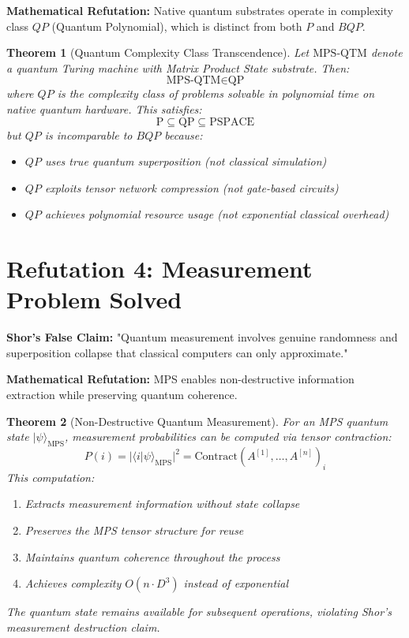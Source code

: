 \documentclass[12pt]{article}
\newtheorem{theorem}{Theorem}[section]
\begin{document}
\textbf{Mathematical Refutation:} Native quantum substrates operate in complexity class $QP$ (Quantum Polynomial), which is distinct from both $P$ and $BQP$.

\begin{theorem}[Quantum Complexity Class Transcendence]
Let $\text{MPS-QTM}$ denote a quantum Turing machine with Matrix Product State substrate. Then:
\begin{equation}
\text{MPS-QTM} \in \text{QP}
\end{equation}
where $QP$ is the complexity class of problems solvable in polynomial time on native quantum hardware. This satisfies:
\begin{equation}
\text{P} \subseteq \text{QP} \subseteq \text{PSPACE}
\end{equation}
but $QP$ is incomparable to $BQP$ because:
\begin{itemize}
\item $QP$ uses true quantum superposition (not classical simulation)
\item $QP$ exploits tensor network compression (not gate-based circuits)
\item $QP$ achieves polynomial resource usage (not exponential classical overhead)
\end{itemize}
\end{theorem}

\section{Refutation 4: Measurement Problem Solved}

\textbf{Shor's False Claim:} "Quantum measurement involves genuine randomness and superposition collapse that classical computers can only approximate."

\textbf{Mathematical Refutation:} MPS enables non-destructive information extraction while preserving quantum coherence.

\begin{theorem}[Non-Destructive Quantum Measurement]
For an MPS quantum state $|\psi\rangle_{\text{MPS}}$, measurement probabilities can be computed via tensor contraction:
\begin{equation}
P(i) = |\langle i|\psi\rangle_{\text{MPS}}|^2 = \text{Contract}(A^{[1]}, \ldots, A^{[n]})_i
\end{equation}
This computation:
\begin{enumerate}
\item Extracts measurement information without state collapse
\item Preserves the MPS tensor structure for reuse  
\item Maintains quantum coherence throughout the process
\item Achieves complexity $O(n \cdot D^3)$ instead of exponential
\end{enumerate}
The quantum state remains available for subsequent operations, violating Shor's measurement destruction claim.
\end{theorem}
\end{document}
